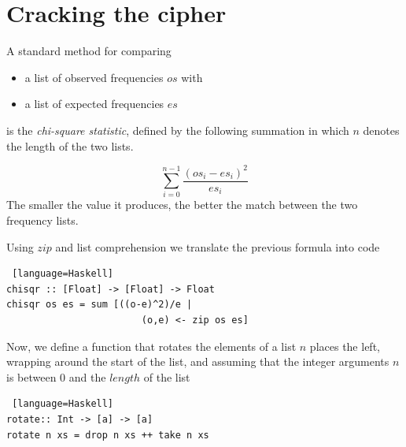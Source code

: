 \documentclass{beamer}
\def\frametitle#1{}
\begin{document}
\section{Cracking the cipher}
\begin{frame}[fragile, label=freq3]
  \frametitle{Frequency Tables cont. } 
  A standard method for comparing 
  \begin{itemize}
  \item a list of observed frequencies $os$ with 
  \item a list of expected frequencies $es$ 
  \end{itemize}
  is the \textit{chi-square statistic}, defined by the following summation in which $n$ denotes the length of the two lists. 

\[\sum_{i=0}^{n-1} \frac{(os_i - es_i)^2}{es_i}\]
\pause
The smaller the value it produces, the better the match between the two frequency lists.  
\vspace{1cm}
\end{frame}

\begin{frame} [fragile, label = test]
  \frametitle{Frequency Tables cont. } 
Using $zip$ and list comprehension we translate the previous formula into code
 
     \begin{onlyenv}
  \begin{lstlisting} [language=Haskell]
chisqr :: [Float] -> [Float] -> Float
chisqr os es = sum [((o-e)^2)/e | 
                        (o,e) <- zip os es]
\end{lstlisting}
 \end{onlyenv}    
 \end{frame}
 
 \begin{frame} [fragile]
    \frametitle{Frequency Tables cont. } 
 Now, we define a function that rotates the elements of a list $n$ places the left, wrapping around the start of the list, and assuming that the integer arguments $n$ is between 0 and the $length$ of the list 
      \begin{onlyenv}
  \begin{lstlisting} [language=Haskell]
rotate:: Int -> [a] -> [a]
rotate n xs = drop n xs ++ take n xs
\end{lstlisting}
 \end{onlyenv}    
 \pagebreak
\end{frame}
 
\end{document}
